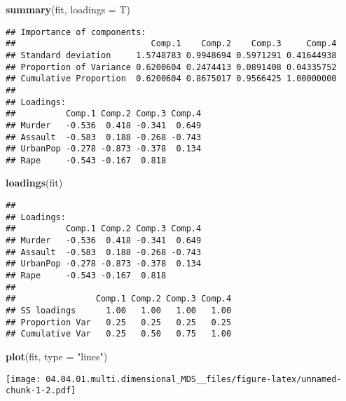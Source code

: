 \documentclass[]{article}
\newenvironment{Shaded}{\begin{snugshade}}{\end{snugshade}}
\newcommand{\KeywordTok}[1]{\textcolor[rgb]{0.13,0.29,0.53}{\textbf{#1}}}
\newcommand{\DataTypeTok}[1]{\textcolor[rgb]{0.13,0.29,0.53}{#1}}
\newcommand{\StringTok}[1]{\textcolor[rgb]{0.31,0.60,0.02}{#1}}
\newcommand{\OperatorTok}[1]{\textcolor[rgb]{0.81,0.36,0.00}{\textbf{#1}}}
\newcommand{\NormalTok}[1]{#1}
\begin{document}
\begin{Shaded}
\begin{Highlighting}[]
\KeywordTok{summary}\NormalTok{(fit, }\DataTypeTok{loadings =}\NormalTok{ T)}
\end{Highlighting}
\end{Shaded}

\begin{verbatim}
## Importance of components:
##                           Comp.1    Comp.2    Comp.3     Comp.4
## Standard deviation     1.5748783 0.9948694 0.5971291 0.41644938
## Proportion of Variance 0.6200604 0.2474413 0.0891408 0.04335752
## Cumulative Proportion  0.6200604 0.8675017 0.9566425 1.00000000
## 
## Loadings:
##          Comp.1 Comp.2 Comp.3 Comp.4
## Murder   -0.536  0.418 -0.341  0.649
## Assault  -0.583  0.188 -0.268 -0.743
## UrbanPop -0.278 -0.873 -0.378  0.134
## Rape     -0.543 -0.167  0.818
\end{verbatim}

\begin{Shaded}
\begin{Highlighting}[]
\KeywordTok{loadings}\NormalTok{(fit)}
\end{Highlighting}
\end{Shaded}

\begin{verbatim}
## 
## Loadings:
##          Comp.1 Comp.2 Comp.3 Comp.4
## Murder   -0.536  0.418 -0.341  0.649
## Assault  -0.583  0.188 -0.268 -0.743
## UrbanPop -0.278 -0.873 -0.378  0.134
## Rape     -0.543 -0.167  0.818       
## 
##                Comp.1 Comp.2 Comp.3 Comp.4
## SS loadings      1.00   1.00   1.00   1.00
## Proportion Var   0.25   0.25   0.25   0.25
## Cumulative Var   0.25   0.50   0.75   1.00
\end{verbatim}

\begin{Shaded}
\begin{Highlighting}[]
\KeywordTok{plot}\NormalTok{(fit, }\DataTypeTok{type =} \StringTok{"lines"}\NormalTok{)}
\end{Highlighting}
\end{Shaded}

\texttt{[image: 04.04.01.multi.dimensional\_MDS\_\_files/figure-latex/unnamed-chunk-1-2.pdf]}

\begin{Shaded}
\end{Shaded}
\end{document}

